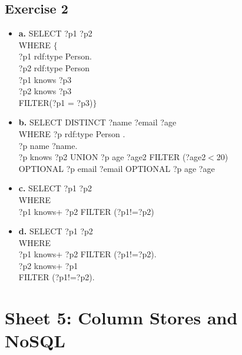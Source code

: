 \documentclass{article}
\begin{document}
\subsection{Exercise 2}
\begin{itemize}
\item \textbf{a. } SELECT ?p1 ?p2  \\WHERE $\{$ \\?p1 rdf:type Person.\\ ?p2 rdf:type Person\\  ?p1 knows ?p3 \\ ?p2 knows ?p3 \\ FILTER(?p1 = ?p3)$\}$
\item \textbf{b. } SELECT DISTINCT ?name ?email ?age \\
WHERE { 
?p rdf:type Person .\\
?p name ?name. \\
{ { ?p knows ?p2 } UNION { ?p age ?age2 FILTER (?age2$<$20) } } \\OPTIONAL { ?p email ?email } OPTIONAL { ?p age ?age }}

\item \textbf{c. } SELECT ?p1 ?p2\\ WHERE { \\?p1 knows+ ?p2 FILTER (?p1!=?p2)\\}

\item \textbf{d. } SELECT ?p1 ?p2\\ WHERE { \\?p1 knows+ ?p2 FILTER (?p1!=?p2).\\ ?p2 knows+ ?p1 \\FILTER (?p1!=?p2).\\}
\end{itemize}

\section{Sheet 5: Column Stores and NoSQL}
\end{document}
